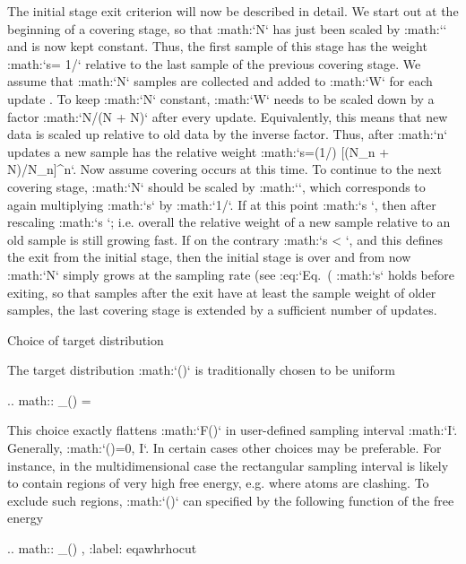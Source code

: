 The initial stage exit criterion will now be described in detail. We
start out at the beginning of a covering stage, so that :math:`N` has
just been scaled by :math:`\gamma` and is now kept constant. Thus, the
first sample of this stage has the weight :math:`s= 1/\gamma` relative
to the last sample of the previous covering stage. We assume that
:math:`\Delta N` samples are collected and added to :math:`W` for each
update . To keep :math:`N` constant, :math:`W` needs to be scaled down
by a factor :math:`N/(N + \Delta N)` after every update. Equivalently,
this means that new data is scaled up relative to old data by the
inverse factor. Thus, after :math:`\Delta n` updates a new sample has
the relative weight
:math:`s=(1/\gamma) [(N_n + \Delta N)/N_n]^{\Delta n}`. Now assume
covering occurs at this time. To continue to the next covering stage,
:math:`N` should be scaled by :math:`\gamma`, which corresponds to again
multiplying :math:`s` by :math:`1/\gamma`. If at this point
:math:`s \ge \gamma`, then after rescaling :math:`s `; i.e. overall
the relative weight of a new sample relative to an old sample is still
growing fast. If on the contrary :math:`s < \gamma`, and this defines
the exit from the initial stage, then the initial stage is over and from
now :math:`N` simply grows at the sampling rate (see
:eq:`Eq. (%
:math:`s` holds before exiting, so that samples after the exit have
at least the sample weight of older samples, the last covering stage is
extended by a sufficient number of updates.

Choice of target distribution
~~~~~~~~~~~~~~~~~~~~~~~~~~~~~

The target distribution :math:`\rho(\lambda)` is traditionally chosen to
be uniform

.. math:: \rho_{}(\lambda) = 

This choice exactly flattens :math:`F(\lambda)` in user-defined
sampling interval :math:`I`. Generally,
:math:`\rho(\lambda)=0, \lambda\notin I`. In certain cases other choices
may be preferable. For instance, in the multidimensional case the
rectangular sampling interval is likely to contain regions of very high
free energy, e.g. where atoms are clashing. To exclude such regions,
:math:`\rho(\lambda)` can specified by the following function of the
free energy

.. math:: \rho_{}(\lambda) \propto {},
          :label: eqawhrhocut
    

